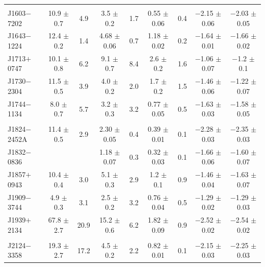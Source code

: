 \documentclass[useAMS,usenatbib]{mn2e}
\begin{document}
\begin{table}
\begin{tabular}{lcccccccc}
               &	                 &        &                   &       &                  &        &                     &                     \\   
 J1603$-$7202  &  10.9  $\pm$ 0.7  &  4.9   &  3.5   $\pm$ 0.2  &  1.7  &  0.55 $\pm$ 0.06 &  0.4   &  $-$2.15 $\pm$ 0.06 &  $-$2.03 $\pm$ 0.05 \\ 
 J1643$-$1224  &  12.4  $\pm$ 0.2  &  1.4   &  4.68  $\pm$ 0.06 &  0.7  &  1.18 $\pm$ 0.02 &  0.2   &  $-$1.64 $\pm$ 0.01 &  $-$1.66 $\pm$ 0.02 \\ 
 J1713$+$0747  &  10.1  $\pm$ 0.8  &  6.2   &  9.1   $\pm$ 0.7  &  8.4  &  2.6  $\pm$ 0.2  &  1.6   &  $-$1.06 $\pm$ 0.07 &  $-$1.2  $\pm$ 0.1 \\ 
 J1730$-$2304  &  11.5  $\pm$ 0.5  &  3.9   &  4.0   $\pm$ 0.2  &  2.0  &  1.7  $\pm$ 0.2  &  1.5   &  $-$1.46 $\pm$ 0.06 &  $-$1.22 $\pm$ 0.07 \\ 
 J1744$-$1134  &  8.0   $\pm$ 0.7  &  5.7   &  3.2   $\pm$ 0.3  &  3.2  &  0.77 $\pm$ 0.05 &  0.5   &  $-$1.63 $\pm$ 0.03 &  $-$1.58 $\pm$ 0.05 \\ 
               &	                 &        &                   &       &                  &        &                     &                     \\  
 J1824$-$2452A &  11.4  $\pm$ 0.5  &  2.9   &  2.30  $\pm$ 0.05 &  0.4  &  0.39 $\pm$ 0.01 &  0.1   &  $-$2.28 $\pm$ 0.03 &  $-$2.35 $\pm$ 0.03 \\ 
 J1832$-$0836  &	                 &        &  1.18  $\pm$ 0.07 &  0.3  &  0.32 $\pm$ 0.03 &  0.1   &  $-$1.66 $\pm$ 0.06 &  $-$1.60 $\pm$ 0.07 \\ 
 J1857$+$0943  &  10.4  $\pm$ 0.4  &  3.0   &  5.1   $\pm$ 0.3  &  2.9  &  1.2  $\pm$ 0.1  &  0.9   &  $-$1.46 $\pm$ 0.04 &  $-$1.63 $\pm$ 0.07 \\ 
 J1909$-$3744  &  4.9   $\pm$ 0.3  &  3.1   &  2.5   $\pm$ 0.2  &  3.2  &  0.76 $\pm$ 0.04 &  0.5   &  $-$1.29 $\pm$ 0.02 &  $-$1.29 $\pm$ 0.03 \\ 
 J1939$+$2134  &  67.8  $\pm$ 2.7  &  20.9  &  15.2  $\pm$ 0.6  &  6.2  &  1.82 $\pm$ 0.09 &  0.9   &  $-$2.52 $\pm$ 0.02 &  $-$2.54 $\pm$ 0.02 \\ 
               &	                 &        &                   &       &                  &        &                     &                     \\   
 J2124$-$3358  &  19.3  $\pm$ 2.7  &  17.2  &  4.5   $\pm$ 0.2  &  2.2  &  0.82 $\pm$ 0.01 &  0.1   &  $-$2.15 $\pm$ 0.03 &  $-$2.25 $\pm$ 0.03 \\ 

\end{tabular}
\end{table}
\end{document}
